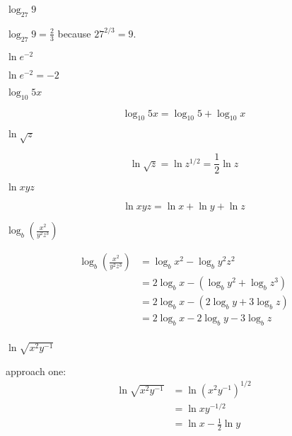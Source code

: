 \documentclass{exam}
\begin{document}
\begin{questions}
\question $\log_{27} 9$
\begin{solution}
$\log_{27} 9 = \frac{2}{3}$ because $27^{2/3} = 9$.
\end{solution}

\question $\ln e^{-2}$
\label{evaluate:last}
\begin{solution}
$\ln e^{-2} = -2$
\end{solution}


\question $\log_{10} 5x$
\label{expand:first}
\begin{solution}
\[
    \log_{10} 5x = \log_{10} 5 + \log_{10} x
\]
\end{solution}

\question $\ln \sqrt{z}$
\begin{solution}
\[
  \ln \sqrt{z} = \ln z^{1/2} = \frac{1}{2} \ln z
\]
\end{solution}

\question $\ln xyz$
\begin{solution}
\[
  \ln xyz = \ln x + \ln y + \ln z  
\]
\end{solution}

\question $\log_b \left( \frac{x^2}{y^2z^3} \right)$
\begin{solution}
\begin{align*}
  \log_b \left( \frac{x^2}{y^2z^3} \right) &= \log_b x^2 - \log_b y^2z^2 \\
  &= 2 \log_b x - \left( \log_b y^2 + \log_b z^3 \right) \\
  &= 2 \log_b x - (2 \log_b y + 3 \log_b z) \\
  &= 2 \log_b x - 2 \log_b y - 3 \log_b z \\
\end{align*}

\end{solution}

\question $\ln \sqrt{x^2y^{-1}}$
\label{expand:last}
\begin{solution}

approach one:
\begin{align*}
  \ln \sqrt{x^2y^{-1}} &= \ln \left(x^2y^{-1} \right)^{1/2} \\
  &= \ln xy^{-1/2} \\
  &= \ln x - \frac{1}{2} \ln y \\
\end{align*}


\end{solution}
\end{questions}
\end{document}
